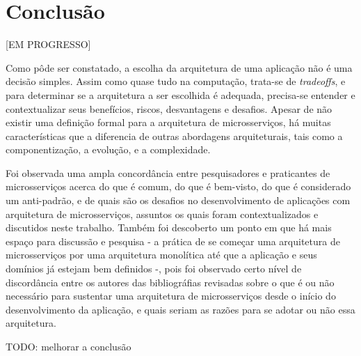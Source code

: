 \chapter{Conclusão}\label{chapter-conclusao}
[EM PROGRESSO]

Como pôde ser constatado, a escolha da arquitetura de uma aplicação não é uma decisão simples. Assim como quase tudo na computação, trata-se de \emph{tradeoffs}, e para determinar se a arquitetura a ser escolhida é adequada, precisa-se entender e contextualizar seus benefícios, riscos, desvantagens e desafios. Apesar de não existir uma definição formal para a arquitetura de microsserviços, há muitas características que a diferencia de outras abordagens arquiteturais, tais como a componentização, a evolução, e a complexidade.

Foi observada uma ampla concordância entre pesquisadores e praticantes de microsserviços acerca do que é comum, do que é bem-visto, do que é considerado um anti-padrão, e de quais são os desafios no desenvolvimento de aplicações com arquitetura de microsserviços, assuntos os quais foram contextualizados e discutidos neste trabalho. Também foi descoberto um ponto em que há mais espaço para discussão e pesquisa - a prática de se começar uma arquitetura de microsserviços por uma arquitetura monolítica até que a aplicação e seus domínios já estejam bem definidos -, pois foi observado certo nível de discordância entre os autores das bibliográfias revisadas sobre o que é ou não necessário para sustentar uma arquitetura de microsserviços desde o início do desenvolvimento da aplicação, e quais seriam as razões para se adotar ou não essa arquitetura.

TODO: melhorar a conclusão



